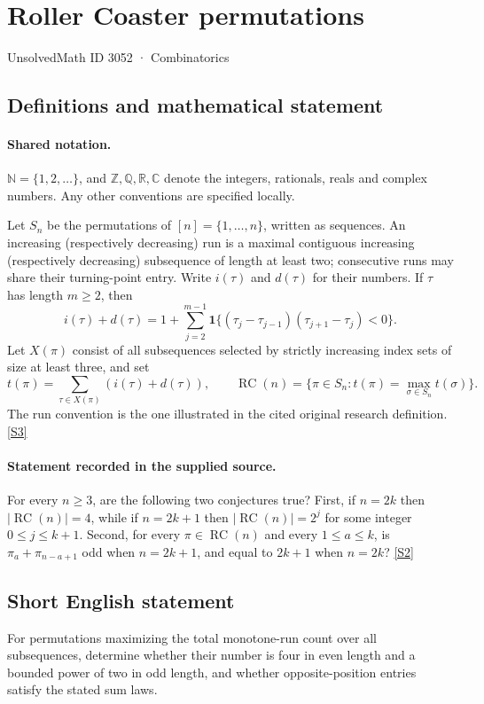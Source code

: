 \documentclass[11pt]{book}
\newcommand{\sref}[2]{\hyperlink{source:#1:#2}{[S#2]}}
\begin{document}
\setcounter{section}{3051}
\section{Roller Coaster permutations}\label{3052}
{\small\sffamily UnsolvedMath ID 3052 · Combinatorics}
\subsection{Definitions and mathematical statement}

\paragraph{Shared notation.}$\mathbb N=\{1,2,\ldots\}$, and $\mathbb Z,\mathbb Q,\mathbb R,\mathbb C$ denote the integers, rationals, reals and complex numbers. Any other conventions are specified locally.


Let $S_n$ be the permutations of $[n]=\{1,\ldots,n\}$, written as sequences. An increasing (respectively decreasing) run is a maximal contiguous increasing (respectively decreasing) subsequence of length at least two; consecutive runs may share their turning-point entry. Write $i(\tau)$ and $d(\tau)$ for their numbers. If $\tau$ has length $m\geq2$, then
\[i(\tau)+d(\tau)=1+\sum_{j=2}^{m-1}\mathbf1\bigl\{(\tau_j-\tau_{j-1})(\tau_{j+1}-\tau_j)<0\bigr\}.\]
Let $X(\pi)$ consist of all subsequences selected by strictly increasing index sets of size at least three, and set
\[t(\pi)=\sum_{\tau\in X(\pi)}(i(\tau)+d(\tau)),\qquad\operatorname{RC}(n)=\{\pi\in S_n:t(\pi)=\max_{\sigma\in S_n}t(\sigma)\}.\]
The run convention is the one illustrated in the cited original research definition. \sref{3052}{3}
\paragraph{Statement recorded in the supplied source.}
For every $n\geq3$, are the following two conjectures true? First, if $n=2k$ then $|\operatorname{RC}(n)|=4$, while if $n=2k+1$ then $|\operatorname{RC}(n)|=2^j$ for some integer $0\leq j\leq k+1$. Second, for every $\pi\in\operatorname{RC}(n)$ and every $1\leq a\leq k$, is $\pi_a+\pi_{n-a+1}$ odd when $n=2k+1$, and equal to $2k+1$ when $n=2k$? \sref{3052}{2}
\subsection{Short English statement}
For permutations maximizing the total monotone-run count over all subsequences, determine whether their number is four in even length and a bounded power of two in odd length, and whether opposite-position entries satisfy the stated sum laws.
\end{document}
